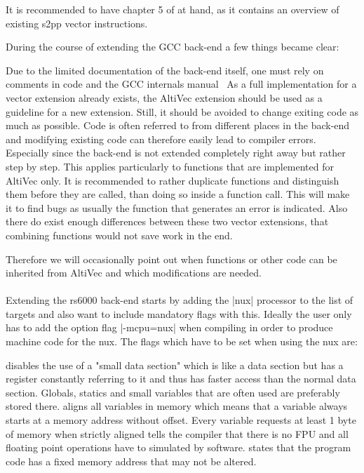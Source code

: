 It is recommended to have chapter 5 of \citep{nux} at hand, as it contains an overview of existing s2pp vector instructions.

During the course of extending the GCC back-end a few things became clear:

Due to the limited documentation of the back-end itself, one must rely on comments in code and the GCC internals manual~\citep{GCCint} 
As a full implementation for a vector extension already exists, the AltiVec extension should be used as a guideline for a new extension. 
Still, it should be avoided to change exiting code as much as possible.
Code is often referred to from different places in the back-end and modifying existing code can therefore easily lead to compiler errors.
Especially since the back-end is not extended completely right away but rather step by step.
This applies particularly to functions that are implemented for AltiVec only.
It is recommended to rather duplicate functions and distinguish them before they are called, than doing so inside a function call.
This will make it to find bugs as usually the function that generates an error is indicated.
Also there do exist enough differences between these two vector extensions, that combining functions would not save work in the end.

Therefore we will occasionally point out when functions or other code can be inherited from AltiVec and which modifications are needed.
\\
\\
Extending the rs6000 back-end starts by adding the |nux| processor to the list of targets and also want to include mandatory flags with this.
Ideally the user only has to add the option flag |-mcpu=nux| when compiling in order to produce machine code for the nux.
The flags which have to be set when using the nux are:
\begin{description}
        disables the use of a "small data section" which is like a data section but has a register constantly referring to it and thus has faster access than the normal data section. Globals, statics and small variables that are often used are preferably stored there.
        aligns all variables in memory which means that a variable always starts at a memory address without offset. Every variable requests at least 1 byte of memory when strictly aligned
        tells the compiler that there is no FPU and all floating point operations have to simulated by software.
        states that the program code has a fixed memory address that may not be altered.
\end{description}


